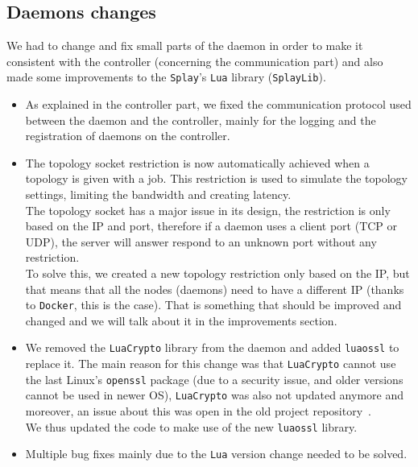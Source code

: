 \documentclass{eplmastersthesis}
\begin{document}
      \subsection{Daemons changes}

        We had to change and fix small parts of the daemon in order to make
        it consistent with the controller (concerning the communication part)
        and also made some improvements to the \texttt{Splay}'s \texttt{Lua} library (\texttt{SplayLib}).

        \begin{itemize}
          \item As explained in the controller part, we fixed the communication
          protocol used between the daemon and the controller, mainly for
          the logging and the registration of daemons on the controller.
          \item The topology socket restriction is now automatically achieved
          when a topology is given with a job. This restriction is used to
          simulate the topology settings, limiting the bandwidth and creating
          latency.\\
          The topology socket has a major issue in its design, the restriction
          is only based on the IP and port, therefore if a daemon uses a client
          port (TCP or UDP), the server will answer respond to an unknown port
          without any restriction.\\
          To solve this, we created a new topology restriction only based on
          the IP, but that means that all the nodes (daemons) need to have a
          different IP (thanks to \texttt{Docker}, this is the case). That is
          something that should be improved and changed and we will talk about
          it in the improvements section.
          \item We removed the \texttt{LuaCrypto} library from the daemon and added
          \texttt{luaossl} to replace it. The main reason for this change was that
          \texttt{LuaCrypto} cannot use the last Linux's \texttt{openssl} package (due to a
          security issue, and older versions cannot be used in newer OS),
          \texttt{LuaCrypto} was also not updated anymore and moreover, an issue about
          this was open in the old project repository~\cite{sslLib}.\\
          We thus updated the code to make use of the new \texttt{luaossl} library.
          \item Multiple bug fixes mainly due to the \texttt{Lua} version change needed
          to be solved.
        \end{itemize}
\end{document}
